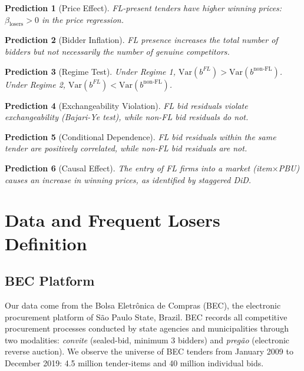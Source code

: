 \documentclass[10pt]{article}
\newtheorem{prediction}{Prediction}
\begin{document}
\begin{prediction}[Price Effect]
FL-present tenders have higher winning prices: $\beta_{\text{losers}} > 0$ in the price regression.
\end{prediction}

\begin{prediction}[Bidder Inflation]
FL presence increases the total number of bidders but not necessarily the number of genuine competitors.
\end{prediction}

\begin{prediction}[Regime Test]
Under Regime 1, $\text{Var}(b^{FL}) > \text{Var}(b^{\text{non-FL}})$. Under Regime 2, $\text{Var}(b^{FL}) < \text{Var}(b^{\text{non-FL}})$.
\end{prediction}

\begin{prediction}[Exchangeability Violation]
FL bid residuals violate exchangeability (Bajari-Ye test), while non-FL bid residuals do not.
\end{prediction}

\begin{prediction}[Conditional Dependence]
FL bid residuals within the same tender are positively correlated, while non-FL bid residuals are not.
\end{prediction}

\begin{prediction}[Causal Effect]
The entry of FL firms into a market (item$\times$PBU) causes an increase in winning prices, as identified by staggered DiD.
\end{prediction}

\section{Data and Frequent Losers Definition}
\label{sec:data}

\subsection{BEC Platform}

Our data come from the Bolsa Eletr\^{o}nica de Compras (BEC), the electronic procurement platform of S\~{a}o Paulo State, Brazil. BEC records all competitive procurement processes conducted by state agencies and municipalities through two modalities: \textit{convite} (sealed-bid, minimum 3 bidders) and \textit{preg\~{a}o} (electronic reverse auction). We observe the universe of BEC tenders from January 2009 to December 2019: 4.5 million tender-items and 40 million individual bids.
\end{document}
